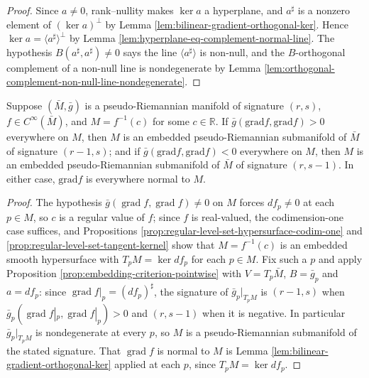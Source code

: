 \begin{proof}
\leanok
{}
Since $a \neq 0$, rank--nullity makes $\ker a$ a hyperplane, and $a^\sharp$ is a nonzero element of $(\ker a)^\perp$ by Lemma \ref{lem:bilinear-gradient-orthogonal-ker}. Hence $\ker a = \langle a^\sharp \rangle^{\perp}$ by Lemma \ref{lem:hyperplane-eq-complement-normal-line}. The hypothesis $B(a^\sharp, a^\sharp) \neq 0$ says the line $\langle a^\sharp\rangle$ is non-null, and the $B$-orthogonal complement of a non-null line is nondegenerate by Lemma \ref{lem:orthogonal-complement-non-null-line-nondegenerate}.
\end{proof}

\begin{corollary}
\label{cor:pseudo-riemannian-embedding-criterion}
\leanok
{}
Suppose $(\bar{M}, \bar{g})$ is a pseudo-Riemannian manifold of signature $(r, s)$, $f \in C^\infty(\bar{M})$, and $M = f^{-1}(c)$ for some $c \in \mathbb{R}$. If $\bar{g}(\text{grad} f, \text{grad} f) > 0$ everywhere on $M$, then $M$ is an embedded pseudo-Riemannian submanifold of $\bar{M}$ of signature $(r-1, s)$; and if $\bar{g}(\text{grad} f, \text{grad} f) < 0$ everywhere on $M$, then $M$ is an embedded pseudo-Riemannian submanifold of $\bar{M}$ of signature $(r, s-1)$. In either case, $\text{grad} f$ is everywhere normal to $M$.
\end{corollary}

\begin{proof}
\leanok
{}
The hypothesis $\bar{g}(\operatorname{grad} f, \operatorname{grad} f) \neq 0$ on $M$ forces $df_p \neq 0$ at each $p \in M$, so $c$ is a regular value of $f$; since $f$ is real-valued, the codimension-one case suffices, and Propositions \ref{prop:regular-level-set-hypersurface-codim-one} and \ref{prop:regular-level-set-tangent-kernel} show that $M = f^{-1}(c)$ is an embedded smooth hypersurface with $T_p M = \ker df_p$ for each $p \in M$. Fix such a $p$ and apply Proposition \ref{prop:embedding-criterion-pointwise} with $V = T_p \bar{M}$, $B = \bar{g}_p$ and $a = df_p$: since $\operatorname{grad} f|_p = (df_p)^\sharp$, the signature of $\bar{g}_p|_{T_p M}$ is $(r-1,s)$ when $\bar{g}_p(\operatorname{grad} f|_p, \operatorname{grad} f|_p) > 0$ and $(r,s-1)$ when it is negative. In particular $\bar{g}_p|_{T_p M}$ is nondegenerate at every $p$, so $M$ is a pseudo-Riemannian submanifold of the stated signature. That $\operatorname{grad} f$ is normal to $M$ is Lemma \ref{lem:bilinear-gradient-orthogonal-ker} applied at each $p$, since $T_p M = \ker df_p$.
\end{proof}

